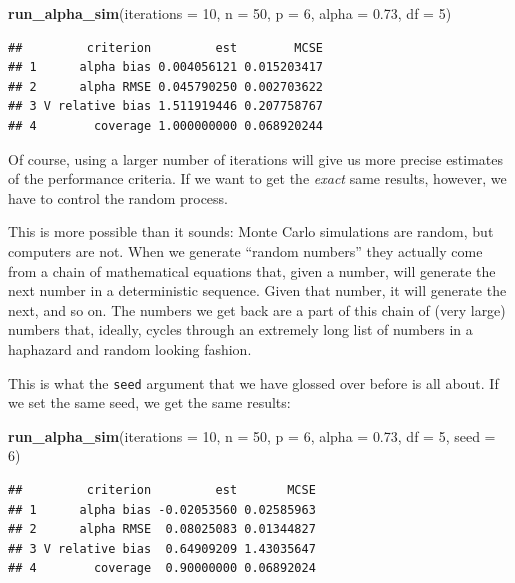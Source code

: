 \documentclass[
]{book}
\newenvironment{Shaded}{\begin{snugshade}}{\end{snugshade}}
\newcommand{\AttributeTok}[1]{\textcolor[rgb]{0.13,0.29,0.53}{#1}}
\newcommand{\DecValTok}[1]{\textcolor[rgb]{0.00,0.00,0.81}{#1}}
\newcommand{\FloatTok}[1]{\textcolor[rgb]{0.00,0.00,0.81}{#1}}
\newcommand{\FunctionTok}[1]{\textcolor[rgb]{0.13,0.29,0.53}{\textbf{#1}}}
\newcommand{\NormalTok}[1]{#1}
\begin{document}
\begin{Shaded}
\begin{Highlighting}[]
\FunctionTok{run\_alpha\_sim}\NormalTok{(}\AttributeTok{iterations =} \DecValTok{10}\NormalTok{, }\AttributeTok{n =} \DecValTok{50}\NormalTok{, }\AttributeTok{p =} \DecValTok{6}\NormalTok{, }\AttributeTok{alpha =} \FloatTok{0.73}\NormalTok{, }\AttributeTok{df =} \DecValTok{5}\NormalTok{)}
\end{Highlighting}
\end{Shaded}

\begin{verbatim}
##         criterion         est        MCSE
## 1      alpha bias 0.004056121 0.015203417
## 2      alpha RMSE 0.045790250 0.002703622
## 3 V relative bias 1.511919446 0.207758767
## 4        coverage 1.000000000 0.068920244
\end{verbatim}

Of course, using a larger number of iterations will give us more precise estimates of the performance criteria. If we want to get the \emph{exact} same results, however, we have to control the random process.

This is more possible than it sounds: Monte Carlo simulations are random, but computers are not.
When we generate ``random numbers'' they actually come from a chain of mathematical equations that, given a number, will generate the next number in a deterministic sequence.
Given that number, it will generate the next, and so on.
The numbers we get back are a part of this chain of (very large) numbers that, ideally, cycles through an extremely long list of numbers in a haphazard and random looking fashion.

This is what the \texttt{seed} argument that we have glossed over before is all about.
If we set the same seed, we get the same results:

\begin{Shaded}
\begin{Highlighting}[]
\FunctionTok{run\_alpha\_sim}\NormalTok{(}\AttributeTok{iterations =} \DecValTok{10}\NormalTok{, }\AttributeTok{n =} \DecValTok{50}\NormalTok{, }\AttributeTok{p =} \DecValTok{6}\NormalTok{, }\AttributeTok{alpha =} \FloatTok{0.73}\NormalTok{, }\AttributeTok{df =} \DecValTok{5}\NormalTok{,}
              \AttributeTok{seed =} \DecValTok{6}\NormalTok{)}
\end{Highlighting}
\end{Shaded}

\begin{verbatim}
##         criterion         est       MCSE
## 1      alpha bias -0.02053560 0.02585963
## 2      alpha RMSE  0.08025083 0.01344827
## 3 V relative bias  0.64909209 1.43035647
## 4        coverage  0.90000000 0.06892024
\end{verbatim}
\end{document}
